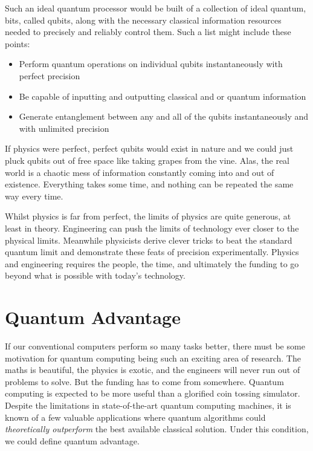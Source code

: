 \documentclass{book}
\begin{document}
Such an ideal quantum processor would be built of a collection of ideal quantum, bits, called qubits, along with the necessary classical information resources needed to precisely and reliably control them. Such a list might include these points:

\begin{itemize}
\item Perform quantum operations on individual qubits instantaneously with perfect precision
\item Be capable of inputting and outputting classical and or quantum information
\item Generate entanglement between any and all of the qubits instantaneously and with unlimited precision 
\end{itemize}

If physics were perfect, perfect qubits would exist in nature and we could just pluck qubits out of free space like taking grapes from the vine. Alas, the real world is a chaotic mess of information constantly coming into and out of existence. Everything takes some time, and nothing can be repeated the same way every time. 

Whilst physics is far from perfect, the limits of physics are quite generous, at least in theory. Engineering can push the limits of technology ever closer to the physical limits. Meanwhile physicists derive clever tricks to beat the standard quantum limit and demonstrate these feats of precision experimentally. Physics and engineering requires the people, the time, and ultimately the funding to go beyond what is possible with today's technology. 

\section{Quantum Advantage} 

If our conventional computers perform so many tasks better, there must be some motivation for quantum computing being such an exciting area of research. The maths is beautiful, the physics is exotic, and the engineers will never run out of problems to solve. But the funding has to come from somewhere. Quantum computing is expected to be more useful than a glorified coin tossing simulator. Despite the limitations in state-of-the-art quantum computing machines, it is known of a few valuable applications where quantum algorithms could \textit{theoretically outperform} the best available classical solution. Under this condition, we could define quantum advantage. 
\end{document}
